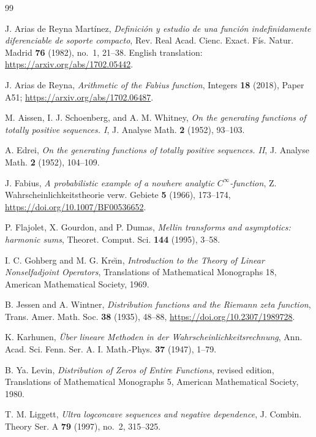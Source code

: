 \documentclass[11pt]{article}
\theoremstyle{definition}
\theoremstyle{remark}
\begin{document}
\begin{thebibliography}{99}

J. Arias de Reyna Mart\'inez,
\emph{Definici\'on y estudio de una funci\'on indefinidamente diferenciable de soporte compacto},
Rev. Real Acad. Cienc. Exact. F\'is. Natur. Madrid \textbf{76} (1982), no.~1, 21--38.
English translation: \url{https://arxiv.org/abs/1702.05442}.

J. Arias de Reyna,
\emph{Arithmetic of the Fabius function},
Integers \textbf{18} (2018), Paper A51;
\url{https://arxiv.org/abs/1702.06487}.

M. Aissen, I. J. Schoenberg, and A. M. Whitney,
\emph{On the generating functions of totally positive sequences. I},
J. Analyse Math. \textbf{2} (1952), 93--103.

A. Edrei,
\emph{On the generating functions of totally positive sequences. II},
J. Analyse Math. \textbf{2} (1952), 104--109.

J. Fabius,
\emph{A probabilistic example of a nowhere analytic \(C^\infty\)-function},
Z. Wahrscheinlichkeitstheorie verw. Gebiete \textbf{5} (1966), 173--174,
\url{https://doi.org/10.1007/BF00536652}.

P. Flajolet, X. Gourdon, and P. Dumas,
\emph{Mellin transforms and asymptotics: harmonic sums},
Theoret. Comput. Sci. \textbf{144} (1995), 3--58.

I. C. Gohberg and M. G. Kre\u\i n,
\emph{Introduction to the Theory of Linear Nonselfadjoint Operators},
Translations of Mathematical Monographs 18, American Mathematical Society, 1969.

B. Jessen and A. Wintner,
\emph{Distribution functions and the Riemann zeta function},
Trans. Amer. Math. Soc. \textbf{38} (1935), 48--88,
\url{https://doi.org/10.2307/1989728}.

K. Karhunen,
\emph{\"Uber lineare Methoden in der Wahrscheinlichkeitsrechnung},
Ann. Acad. Sci. Fenn. Ser. A. I. Math.-Phys. \textbf{37} (1947), 1--79.

B. Ya. Levin,
\emph{Distribution of Zeros of Entire Functions},
revised edition, Translations of Mathematical Monographs 5, American Mathematical
Society, 1980.

T. M. Liggett,
\emph{Ultra logconcave sequences and negative dependence},
J. Combin. Theory Ser. A \textbf{79} (1997), no.~2, 315--325.


\end{thebibliography}
\end{document}
